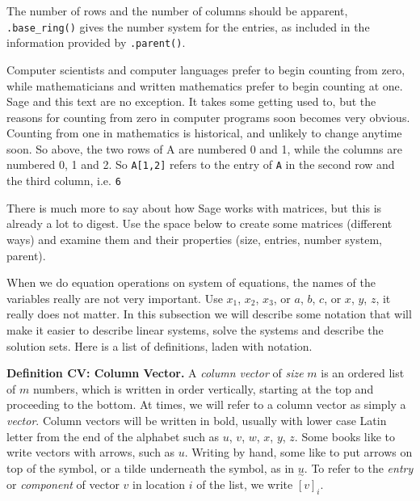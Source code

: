 \documentclass[openany]{book}
\begin{document}
\begin{compute}
\end{compute}

\begin{compute}
\end{compute}

\begin{compute}
\end{compute}

\begin{compute}
\end{compute}

The number of rows and the number of columns should be apparent,
\texttt{.base\_ring()} gives the number system for the entries, as
included in the information provided by \texttt{.parent()}.

Computer scientists and computer languages prefer to begin counting from
zero, while mathematicians and written mathematics prefer to begin
counting at one. Sage and this text are no exception. It takes some
getting used to, but the reasons for counting from zero in computer
programs soon becomes very obvious. Counting from one in mathematics is
historical, and unlikely to change anytime soon. So above, the two rows
of A are numbered 0 and 1, while the columns are numbered 0, 1 and 2. So
\texttt{A{[}1,2{]}} refers to the entry of \texttt{A} in the second row
and the third column, i.e. \texttt{6}

There is much more to say about how Sage works with matrices, but this
is already a lot to digest. Use the space below to create some matrices
(different ways) and examine them and their properties (size, entries,
number system, parent).

\begin{compute}
\end{compute}

When we do equation operations on system of equations, the names of the
variables really are not very important. Use \(x_1\), \(x_2\), \(x_3\),
or \(a\), \(b\), \(c\), or \(x\), \(y\), \(z\), it really does not
matter. In this subsection we will describe some notation that will make
it easier to describe linear systems, solve the systems and describe the
solution sets. Here is a list of definitions, laden with notation.

\textbf{Definition CV: Column Vector.} A \emph{column vector} of
\emph{size} \(m\) is an ordered list of \(m\) numbers, which is written
in order vertically, starting at the top and proceeding to the bottom.
At times, we will refer to a column vector as simply a \emph{vector}.
Column vectors will be written in bold, usually with lower case Latin
letter from the end of the alphabet such as \({u}\), \({v}\), \({w}\),
\({x}\), \({y}\), \({z}\). Some books like to write vectors with arrows,
such as \({u}\). Writing by hand, some like to put arrows on top of the
symbol, or a tilde underneath the symbol, as in
\(\underset{\sim}{\textstyle u}\). To refer to the \emph{entry} or
\emph{component} of vector \({v}\) in location \(i\) of the list, we
write \([{v}]_{i}\).
\end{document}
